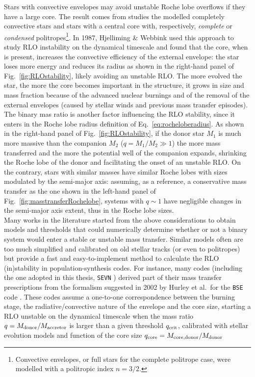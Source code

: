 \documentclass[a4paper,titlepage]{book}     	%
\begin{document}
Stars with convective envelopes may avoid unstable Roche lobe overflows if they have a large core. The result comes from studies the modelled completely convective stars and stars with a central core with, respectively, \emph{complete} or \emph{condensed} politropes\footnote{Convective envelopes, or full stars for the complete politrope case, were modelled with a politropic index $n=3/2$.}. In 1987, Hjelliming \& Webbink \cite{hjellmingwebbink1987_coreRLOF} used this approach to study RLO instability on the dynamical timescale and found that the core, when is present, increases the convective efficiency of the external envelope: the star loses more energy and reduces its radius as shown in the right-hand panel of Fig.\ \ref{fig:RLOstability}, likely avoiding an unstable RLO. The more evolved the star, the more the core becomes important in the structure, it grows in size and mass fraction because of the advanced nuclear burnings and of the removal of the external envelopes (caused by stellar winds and previous mass transfer episodes).\\

The binary mas ratio is another factor influencing the RLO stability, since it enters in the Roche lobe radius definition of Eq.\ \ref{eq:rocheloberadius}. As shown in the right-hand panel of Fig.\ \ref{fig:RLOstability}, if the donor star $M_1$ is much more massive than the companion $M_2$ ($q=M_1/M_2 \gg 1$) the more mass transferred and the more the potential well of the companion expands, shrinking the Roche lobe of the donor and facilitating the onset of an unstable RLO. On the contrary, stars with similar masses have similar Roche lobes with sizes modulated by the semi-major axis: assuming, as a reference, a conservative mass transfer as the one shown in the left-hand panel of Fig.\ \ref{fig:masstransferRochelobe}, systems with $q \sim 1$ have negligible changes in the semi-major axis extent, thus in the Roche lobe sizes. \\

Many works in the literature started from the above considerations to obtain models and thresholds that could numerically determine whether or not a binary system would enter a stable or unstable mass transfer. Similar models often are too much simplified and calibrated on old stellar tracks (or even to politropes) but provide a fast and easy-to-implement method to calculate the RLO (in)stability in population-synthesis codes. For instance, many codes (including the one adopted in this thesis, \texttt{SEVN} \cite{spera2019_mergingBBH}) derived part of their mass transfer prescriptions from the formalism suggested in 2002 by Hurley et al.\ for the \texttt{BSE} code \cite{Hurley2002}. These codes assume a one-to-one correspondence between the burning stage, the radiative/convective nature of the envelope and the core size, starting a RLO unstable on the dynamical timescale when the mass ratio $q=M_{\rm donor}/M_{\rm accretor}$ is larger than a given threshold $q_{\rm crit}$, calibrated with stellar evolution models and function of the core size $q_{\rm core}=M_{\rm core, donor}/M_{\rm donor}$
\end{document}
